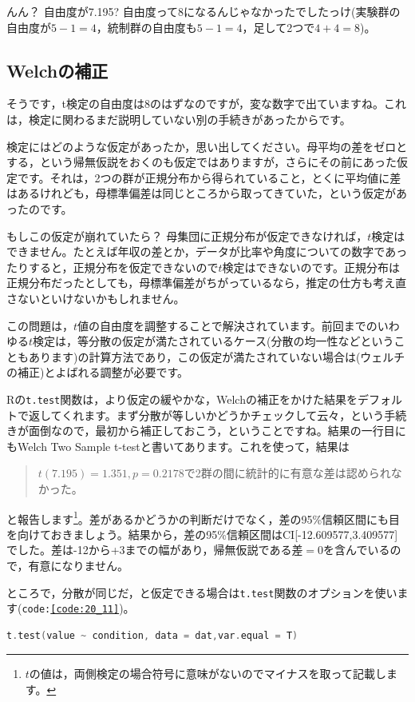 \documentclass{ltjsbook}
\begin{document}
んん？ 自由度が7.195? 自由度って8になるんじゃなかったでしたっけ(実験群の自由度が$5-1=4$，統制群の自由度も$5-1=4$，足して2つで$4+4=8$)。

\subsection{Welchの補正}
そうです，t検定の自由度は$8$のはずなのですが，変な数字で出ていますね。これは，検定に関わるまだ説明していない別の手続きがあったからです。

検定にはどのような仮定があったか，思い出してください。母平均の差をゼロとする，という帰無仮説をおくのも仮定ではありますが，さらにその前にあった仮定です。それは，2つの群が正規分布から得られていること，とくに平均値に差はあるけれども，母標準偏差は同じところから取ってきていた，という仮定があったのです。

もしこの仮定が崩れていたら？ 母集団に正規分布が仮定できなければ，$t$検定はできません。たとえば年収の差とか，データが比率や角度についての数字であったりすると，正規分布を仮定できないので$t$検定はできないのです。正規分布は正規分布だったとしても，母標準偏差がちがっているなら，推定の仕方も考え直さないといけないかもしれません。

この問題は，$t$値の自由度を調整することで解決されています。前回までのいわゆる$t$検定は，等分散の仮定が満たされているケース(分散の均一性などということもあります)の計算方法であり，この仮定が満たされていない場合は(ウェルチの補正)とよばれる調整が必要です。

Rの\texttt{t.test}関数は，より仮定の緩やかな，Welchの補正をかけた結果をデフォルトで返してくれます。まず分散が等しいかどうかチェックして云々，という手続きが面倒なので，最初から補正しておこう，ということですね。結果の一行目にもWelch Two Sample t-testと書いてあります。これを使って，結果は
\begin{quote}
	$t(7.195)=1.351,p = 0.2178$で2群の間に統計的に有意な差は認められなかった。
\end{quote}
と報告します\footnote{$t$の値は，両側検定の場合符号に意味がないのでマイナスを取って記載します。}。差があるかどうかの判断だけでなく，差の95\%信頼区間にも目を向けておきましょう。結果から，差の95\%信頼区間はCI[-12.609577,3.409577]でした。差は-12から+3までの幅があり，帰無仮説である差$=0$を含んでいるので，有意になりません。


ところで，分散が同じだ，と仮定できる場合は\texttt{t.test}関数のオプションを使います(\texttt{code:\ref{code:20_11}})。

\begin{lstlisting}[language=c++,label={code:20_11},caption={分散のオプション指定}]
t.test(value ~ condition, data = dat,var.equal = T)
\end{lstlisting}
\end{document}
